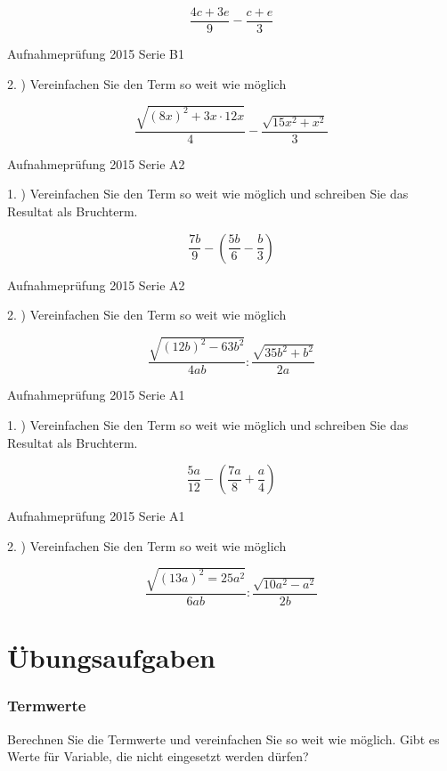 $$\frac{4c+3e}{9} - \frac{c+e}{3}$$

Aufnahmeprüfung 2015 Serie B1

2. ) Vereinfachen Sie den Term so weit wie möglich

$$\frac{\sqrt{(8x)^2+3x\cdot{}12x}}4 - \frac{\sqrt{15x^2+x^2}}3$$

Aufnahmeprüfung 2015 Serie A2

1. ) Vereinfachen Sie den Term so weit wie möglich und schreiben Sie
das Resultat als Bruchterm.

$$\frac{7b}9 - \left( \frac{5b}6 - \frac{b}3 \right)$$

Aufnahmeprüfung 2015 Serie A2

2. ) Vereinfachen Sie den Term so weit wie möglich

$$\frac{\sqrt{(12b)^2 - 63b^2}}{4ab} : \frac{\sqrt{35b^2 + b^2}}{2a}$$

Aufnahmeprüfung 2015 Serie A1

1. ) Vereinfachen Sie den Term so weit wie möglich und schreiben Sie
das Resultat als Bruchterm.

$$\frac{5a}{12} - \left( \frac{7a}8 + \frac{a}4 \right)$$

Aufnahmeprüfung 2015 Serie A1

2. ) Vereinfachen Sie den Term so weit wie möglich

$$\frac{\sqrt{(13a)^2 = 25a^2}}{6ab} : \frac{\sqrt{10a^2 - a^2}}{2b}$$

\newpage


\part{Übungsaufgaben}

\section{Termwerte}
Berechnen Sie die Termwerte und vereinfachen Sie so weit wie
möglich. Gibt es Werte für Variable, die nicht eingesetzt werden dürfen?

